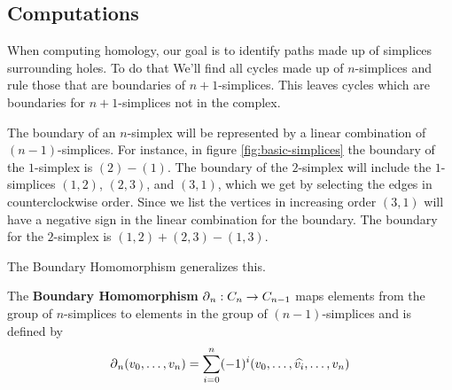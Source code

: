 {\subsection{Computations}

%         

When computing homology, our goal is to identify paths made up of simplices surrounding holes. To do that We'll find all cycles made up of \(n\)-simplices and rule those that are boundaries of \(n+1\)-simplices. This leaves cycles which are boundaries for \(n+1\)-simplices not in the complex.

The boundary of an \(n\)-simplex will be represented by a linear combination of \((n-1)\)-simplices. For instance, in figure \ref{fig:basic-simplices} the boundary of the \(1\)-simplex is \((2)-(1)\). The boundary of the \(2\)-simplex will include the \(1\)-simplices \((1,2)\), \((2,3)\), and \((3,1)\), which we get by selecting the edges in counterclockwise order. Since we list the vertices in increasing order \((3,1)\) will have a negative sign in the linear combination for the boundary. The boundary for the \(2\)-simplex is \((1,2) + (2,3) - (1,3)\).

The Boundary Homomorphism generalizes this.

\begin{definition}
    The \textbf{Boundary Homomorphism} \(\operatorname{\partial}_n : C_n \to C_{n-1}\) maps elements from the group of \(n\)-simplices to elements in the group of \((n-1)\)-simplices and is defined by
    \[
        \operatorname{\partial}_n (v_0,\dots , v_{n}) = \sum_{i=0}^n (-1)^{i}
        (v_0,\dots, \widehat{v_i}, \dots, v_n)
    \]
    \cite{hatcher}
\end{definition}

}
